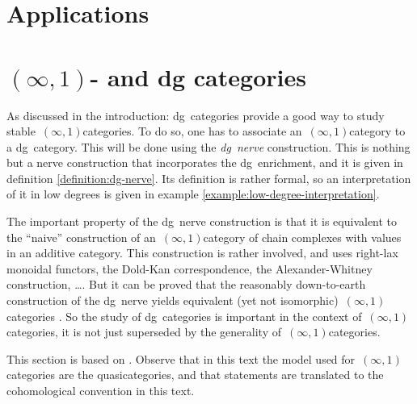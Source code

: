 \section{Applications}


\section{\texorpdfstring{$(\infty,1)$-}{(oo,1)-} and dg categories}
As discussed in the introduction: dg~categories provide a good way to study stable~$(\infty,1)$\dash categories. To do so, one has to associate an~$(\infty,1)$\dash category to a dg~category. This will be done using the \emph{dg~nerve} construction. This is nothing but a nerve construction that incorporates the dg~enrichment, and it is given in definition \ref{definition:dg-nerve}. Its definition is rather formal, so an interpretation of it in low degrees is given in example \ref{example:low-degree-interpretation}.

The important property of the dg~nerve construction is that it is equivalent to the ``naive'' construction of an~$(\infty,1)$\dash category of chain complexes with values in an additive category. This construction is rather involved, and uses right-lax monoidal functors, the Dold-Kan correspondence, the Alexander-Whitney construction, \ldots. But it can be proved that the reasonably down-to-earth construction of the dg~nerve yields equivalent (yet not isomorphic)~$(\infty,1)$\dash categories \cite[proposition 1.3.1.17]{htt}. So the study of dg~categories is important in the context of~$(\infty,1)$\dash categories, it is not just superseded by the generality of~$(\infty,1)$\dash categories.

This section is based on \cite[section 1.3.1]{htt}. Observe that in this text the model used for~$(\infty,1)$\dash categories are the quasicategories, and that statements are translated to the cohomological convention in this text.

